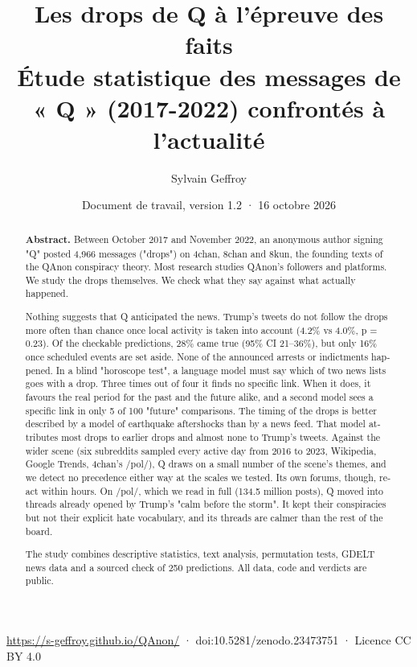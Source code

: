 \documentclass[11pt,a4paper]{article}
\title{Les drops de Q à l'épreuve des faits\\[4pt]\large Étude statistique des messages de « Q » (2017-2022) confrontés à l'actualité}
\author{Sylvain Geffroy}
\date{Document de travail, version 1.2 · 16 octobre 2026}
\begin{document}
\maketitle
\begin{center}\small \url{https://s-geffroy.github.io/QAnon/} · doi:10.5281/zenodo.23473751 · Licence CC BY 4.0\end{center}
\begin{abstract}\begin{otherlanguage}{english}\noindent\textbf{Abstract.} Between October 2017 and November 2022, an anonymous author signing "Q" posted 4,966 messages ("drops") on 4chan, 8chan and 8kun, the founding texts of the QAnon conspiracy theory. Most research studies QAnon's followers and platforms. We study the drops themselves. We check what they say against what actually happened.

Nothing suggests that Q anticipated the news. Trump's tweets do not follow the drops more often than chance once local activity is taken into account (4.2\% vs 4.0\%, p = 0.23). Of the checkable predictions, 28\% came true (95\% CI 21–36\%), but only 16\% once scheduled events are set aside. None of the announced arrests or indictments happened. In a blind "horoscope test", a language model must say which of two news lists goes with a drop. Three times out of four it finds no specific link. When it does, it favours the real period for the past and the future alike, and a second model sees a specific link in only 5 of 100 "future" comparisons. The timing of the drops is better described by a model of earthquake aftershocks than by a news feed. That model attributes most drops to earlier drops and almost none to Trump's tweets. Against the wider scene (six subreddits sampled every active day from 2016 to 2023, Wikipedia, Google Trends, 4chan's /pol/), Q draws on a small number of the scene's themes, and we detect no precedence either way at the scales we tested. Its own forums, though, react within hours. On /pol/, which we read in full (134.5 million posts), Q moved into threads already opened by Trump's "calm before the storm". It kept their conspiracies but not their explicit hate vocabulary, and its threads are calmer than the rest of the board.

The study combines descriptive statistics, text analysis, permutation tests, GDELT news data and a sourced check of 250 predictions. All data, code and verdicts are public.\end{otherlanguage}\end{abstract}
\end{document}

